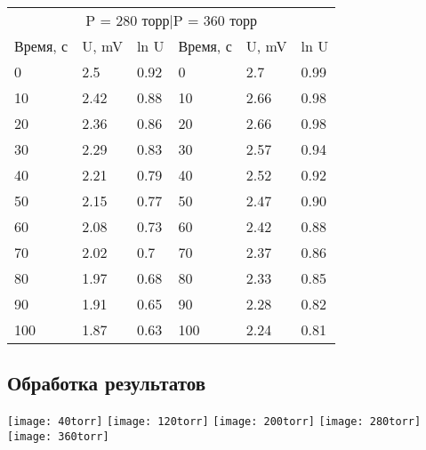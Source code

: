 \documentclass[a4paper,12pt]{article}
\begin{document}
		\begin{center}
			\begin{tabular}{  l  l  p{1cm} | l  l  p{1cm}}
				\multicolumn{6}{c}{P = 280 торр\qquad |\qquad P = 360 торр} \\
				Время, с & U, mV & ln U & Время, с & U, mV & ln U \\ \hline
				0    & 2.5  &  0.92 & 0   & 2.7  &  0.99 \\ \hline
				10   & 2.42  &  0.88 & 10   & 2.66  &  0.98 \\ \hline
				20   & 2.36  &  0.86 & 20   & 2.66  &  0.98 \\ \hline
				30   & 2.29  &  0.83 & 30   & 2.57  &  0.94 \\ \hline
				40   & 2.21  &  0.79 & 40   & 2.52  &  0.92 \\ \hline
				50   & 2.15  &  0.77 & 50   & 2.47  &  0.90 \\ \hline
				60   & 2.08  &  0.73 & 60   & 2.42  &  0.88 \\ \hline
				70   & 2.02  &  0.7 & 70   & 2.37  &  0.86 \\ \hline
				80   & 1.97  &  0.68 & 80   & 2.33  &  0.85 \\ \hline
				90   & 1.91  &  0.65 & 90   & 2.28  &  0.82 \\ \hline
				100   & 1.87  &  0.63 & 100   & 2.24  &  0.81 \\ \hline
			\end{tabular}
		\end{center}
		\subsection{Обработка результатов}
		\texttt{[image: 40torr]}\newline
		\texttt{[image: 120torr]}\newline
		\texttt{[image: 200torr]}\newline
		\texttt{[image: 280torr]}\newline
		\texttt{[image: 360torr]}\newline
\end{document}
